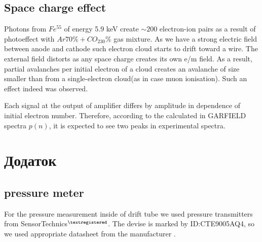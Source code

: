 \documentclass[12pt,a4paper]{article}
\begin{document}
	\subsection{ Space charge effect}
	
	Photons from $Fe^{55}$ of energy 5.9 keV create $\sim 200$ electron-ion pairs as a result of photoeffect with $Ar70\%+CO_230\%$ gas mixture. As we have a strong electric field between anode and cathode such electron cloud starts to drift toward a wire. The external field distorts as any space charge creates its own e/m field. As a result, partial avalanches per initial electron of a cloud creates an avalanche of size smaller than from a single-electron cloud(as in case muon ionisation).
	Such an effect indeed was observed.
	
	Each signal at the output of amplifier differs by amplitude in dependence of initial electron number. Therefore, according to the calculated in GARFIELD spectra $p(n)$, it is expected to see two peaks in experimental spectra.
		
	
	
	
	
\newpage
\section{Додаток}

\subsection{pressure meter}

	For the pressure measurement inside of drift tube we used pressure transmitters from SensorTechnics$^{\textregistered}$. The devise is marked by ID:CTE9005AQ4, so we used appropriate datasheet  from the manufacturer \cite{presTransmitDatasheet}.
	
\end{document}
